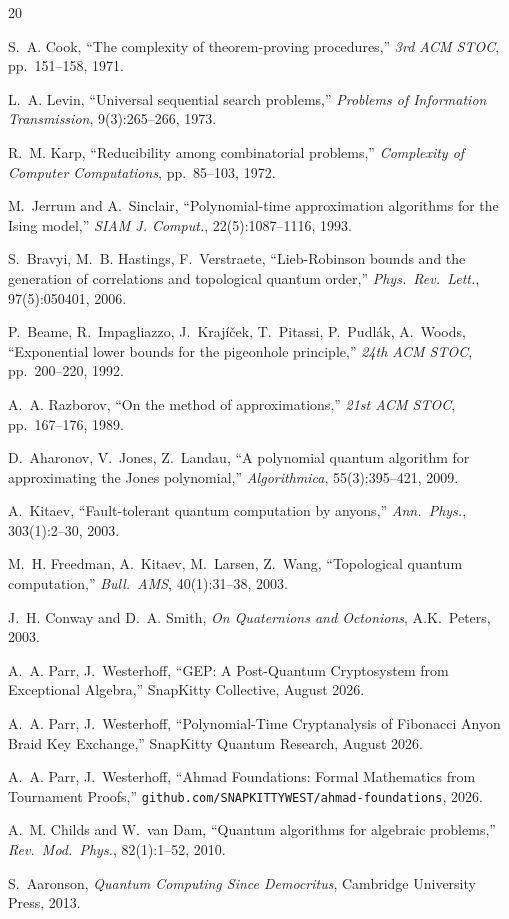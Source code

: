 \documentclass[11pt,letterpaper]{article}
\begin{document}
\begin{thebibliography}{20}

S.~A. Cook,
``The complexity of theorem-proving procedures,''
\emph{3rd ACM STOC}, pp.~151--158, 1971.

L.~A. Levin,
``Universal sequential search problems,''
\emph{Problems of Information Transmission}, 9(3):265--266, 1973.

R.~M. Karp,
``Reducibility among combinatorial problems,''
\emph{Complexity of Computer Computations}, pp.~85--103, 1972.

M.~Jerrum and A.~Sinclair,
``Polynomial-time approximation algorithms for the Ising model,''
\emph{SIAM J. Comput.}, 22(5):1087--1116, 1993.

S.~Bravyi, M.~B. Hastings, F.~Verstraete,
``Lieb-Robinson bounds and the generation of correlations and
topological quantum order,''
\emph{Phys.\ Rev.\ Lett.}, 97(5):050401, 2006.

P.~Beame, R.~Impagliazzo, J.~Kraj\'i\v{c}ek, T.~Pitassi, P.~Pudl\'ak, A.~Woods,
``Exponential lower bounds for the pigeonhole principle,''
\emph{24th ACM STOC}, pp.~200--220, 1992.

A.~A. Razborov,
``On the method of approximations,''
\emph{21st ACM STOC}, pp.~167--176, 1989.

D.~Aharonov, V.~Jones, Z.~Landau,
``A polynomial quantum algorithm for approximating the Jones polynomial,''
\emph{Algorithmica}, 55(3):395--421, 2009.

A.~Kitaev,
``Fault-tolerant quantum computation by anyons,''
\emph{Ann.\ Phys.}, 303(1):2--30, 2003.

M.~H. Freedman, A.~Kitaev, M.~Larsen, Z.~Wang,
``Topological quantum computation,''
\emph{Bull.\ AMS}, 40(1):31--38, 2003.

J.~H. Conway and D.~A. Smith,
\emph{On Quaternions and Octonions}, A.K.\ Peters, 2003.

A.~A. Parr, J.~Westerhoff,
``GEP: A Post-Quantum Cryptosystem from Exceptional Algebra,''
SnapKitty Collective, August 2026.

A.~A. Parr, J.~Westerhoff,
``Polynomial-Time Cryptanalysis of Fibonacci Anyon Braid Key Exchange,''
SnapKitty Quantum Research, August 2026.

A.~A. Parr, J.~Westerhoff,
``Ahmad Foundations: Formal Mathematics from Tournament Proofs,''
\texttt{github.com/SNAPKITTYWEST/ahmad-foundations}, 2026.

A.~M. Childs and W.~van Dam,
``Quantum algorithms for algebraic problems,''
\emph{Rev.\ Mod.\ Phys.}, 82(1):1--52, 2010.

S.~Aaronson,
\emph{Quantum Computing Since Democritus}, Cambridge University Press, 2013.

\end{thebibliography}
\end{document}
